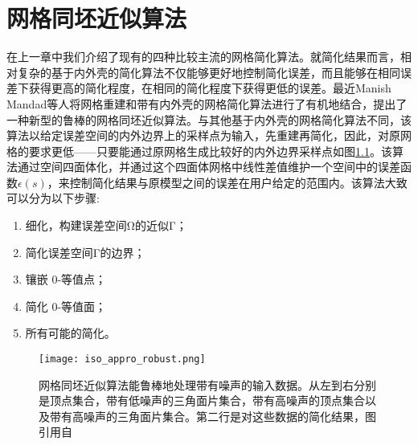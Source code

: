 
\chapter{网格同坯近似算法}
在上一章中我们介绍了现有的四种比较主流的网格简化算法。就简化结果而言，相对复杂的基于内外壳的简化算法不仅能够更好地控制简化误差，而且能够在相同误差下获得更高的简化程度，在相同的简化程度下获得更低的误差。最近Manish Mandad等人将网格重建和带有内外壳的网格简化算法进行了有机地结合，提出了一种新型的鲁棒的网格同坯近似算法\cite{isotopic-appro}。与其他基于内外壳的网格简化算法不同，该算法以给定误差空间的内外边界上的采样点为输入，先重建再简化，因此，对原网格的要求更低——只要能通过原网格生成比较好的内外边界采样点如图\ref{fig:iso-appro-robust}。该算法通过空间四面体化，并通过这个四面体网格中线性差值维护一个空间中的误差函数$\epsilon(s)$，来控制简化结果与原模型之间的误差在用户给定的范围内。该算法大致可以分为以下步骤:
\begin{enumerate}[（1）]
  \item 细化，构建误差空间Ω的近似Γ；
  \item 简化误差空间Γ的边界；
  \item 镶嵌 0-等值点；
  \item 简化 0-等值面；
  \item 所有可能的简化。
\end{enumerate}
\begin{figure}[htbp]
    \centering
    \texttt{[image: iso\_appro\_robust.png]}
    \caption{网格同坯近似算法能鲁棒地处理带有噪声的输入数据。从左到右分别是顶点集合，带有低噪声的三角面片集合，带有高噪声的顶点集合以及带有高噪声的三角面片集合。第二行是对这些数据的简化结果，图引用自\cite{isotopic-appro}}
    \label{fig:iso-appro-robust}
\end{figure}

